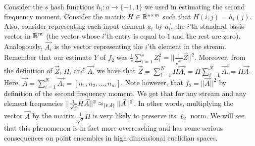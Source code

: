 \documentclass{article}
\begin{document}
Consider the $s$ hash functions $h_i:a\rightarrow \{-1,1\}$ we used in estimating the second frequency moment.  
Consider the matrix $H \in {\mathbb{R}}^{s \times m}$ such that $H(i,j) = h_{i}(j)$.
Also, consider representing each input element $a_i$ by $\vec{a_i}$, the $i$'th 
standard basis vector in ${\mathbb{R}}^m$ (the vector whose $i$'th entry is equal to $1$ and the rest are zero). 
Analogously, $\vec{A_i}$ is the vector representing the $i$'th element in the stream. 
Remember that our estimate $Y$ of $f_2$ was $\frac{1}{s}\sum_{i=1}^{s}Z_{i}^2= ||\frac{1}{\sqrt{s}}\vec{Z}||^2$. 
Moreover, from the definition of $\vec{Z}$, $H$, and $\vec{A_i}$ we have 
that $\vec{Z} = \sum_{i=1}^{N}H\vec{A_i} = H\sum_{i=1}^{N}\vec{A_i} = H\vec{A}$. 
Here, $\vec{A} = \sum_{i=1}^{N}\vec{A_i} = [n_1,n_2,\ldots,n_m]$. 
Note however, that $f_2 = ||\vec{A}||^2$ by definition of the second frequency moment.
We get that for any stream and any element frequencies $ ||\frac{1}{\sqrt{s}}H\vec{A}||^2 \approx_{(\varepsilon,\delta)} ||\vec{A}||^2$.
In other words,  multiplying the vector $\vec{A}$ by the matrix $\frac{1}{\sqrt{s}}H$ is very likely to preserve its $\ell_2$ norm.
We will see that this phenomenon is in fact more overreaching and has some serious consequences on point ensembles in high dimensional euclidian spaces. 




\end{document}
